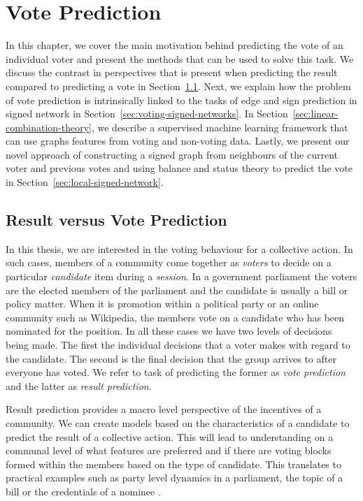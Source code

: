 \chapter{Vote Prediction}
\label{chp:vote-prediction}
In this chapter, we cover the main motivation behind predicting the vote of an individual voter and present the methods that can be used to solve this task. We discuss the contrast in perspectives that is present when predicting the result compared to predicting a vote in Section~\ref{sec:result-vs-vote}. Next, we explain how the problem of vote prediction is intrinsically linked to the tasks of edge and sign prediction in signed network in Section~\ref{sec:voting-signed-networks}. In Section~\ref{sec:linear-combination-theory}, we describe a supervised machine learning framework that can use graphs features from voting and non-voting data. Lastly, we present our novel approach of constructing a signed graph from neighbours of the current voter and previous votes and using balance and status theory to predict the vote in Section~\ref{sec:local-signed-network}. 


\section{Result versus Vote Prediction}
\label{sec:result-vs-vote}
In this thesis, we are interested in the voting behaviour for a collective action. In such cases, members of a community come together as \textit{voters} to decide on a particular \textit{candidate} item during a \textit{session}. In a government parliament  the voters are the elected members of the parliament and the candidate is usually a bill or policy matter. When it is promotion within a political party or an online community such as Wikipedia, the members vote on a candidate who has been nominated for the position. In all these cases we have two levels of decisions being made. The first the individual decisions that a voter makes with regard to the candidate. The second is the final decision that the group arrives to after everyone has voted. We refer to task of predicting the former as \textit{vote prediction} and the latter as \textit{result prediction}. 

Result prediction provides a macro level perspective of the incentives of a community. We can create models based on the characteristics of a candidate to predict the result of a collective action. This will lead to understanding on a communal level of what features are preferred and if there are voting blocks formed within the members based on the type of candidate. This translates to practical examples such as party level dynamics in a parliament, the topic of a bill or the credentials of a nominee \cite{burke2008mopping,yano2012textual,yogatama-etal-2011-predicting}. 


